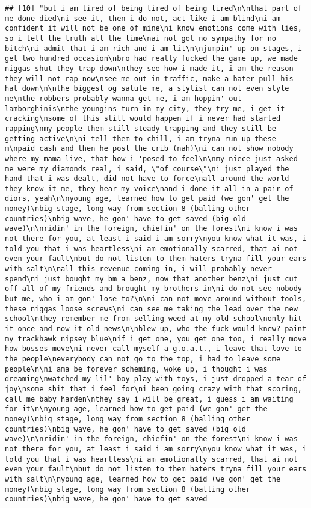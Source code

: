 \documentclass[]{article}
\begin{document}
\begin{verbatim}
## [10] "but i am tired of being tired of being tired\n\nthat part of me done died\ni see it, then i do not, act like i am blind\ni am confident it will not be one of mine\ni know emotions come with lies, so i tell the truth all the time\nai not got no sympathy for no bitch\ni admit that i am rich and i am lit\n\njumpin' up on stages, i get two hundred occasion\nbro had really fucked the game up, we made niggas shut they trap down\nthey see how i made it, i am the reason they will not rap now\nsee me out in traffic, make a hater pull his hat down\n\nthe biggest og salute me, a stylist can not even style me\nthe robbers probably wanna get me, i am hoppin' out lamborghinis\nthe youngins turn in my city, they try me, i get it cracking\nsome of this still would happen if i never had started rapping\nmy people them still steady trapping and they still be getting active\n\ni tell them to chill, i am tryna run up these m\npaid cash and then he post the crib (nah)\ni can not show nobody where my mama live, that how i 'posed to feel\n\nmy niece just asked me were my diamonds real, i said, \"of course\"\ni just played the hand that i was dealt, did not have to force\nall around the world they know it me, they hear my voice\nand i done it all in a pair of diors, yeah\n\nyoung age, learned how to get paid (we gon' get the money)\nbig stage, long way from section 8 (balling other countries)\nbig wave, he gon' have to get saved (big old wave)\n\nridin' in the foreign, chiefin' on the forest\ni know i was not there for you, at least i said i am sorry\nyou know what it was, i told you that i was heartless\ni am emotionally scarred, that ai not even your fault\nbut do not listen to them haters tryna fill your ears with salt\n\nall this revenue coming in, i will probably never spend\ni just bought my bm a benz, now that another benz\ni just cut off all of my friends and brought my brothers in\ni do not see nobody but me, who i am gon' lose to?\n\ni can not move around without tools, these niggas loose screws\ni can see me taking the lead over the new school\nthey remember me from selling weed at my old school\nonly hit it once and now it old news\n\nblew up, who the fuck would knew? paint my trackhawk nipsey blue\nif i get one, you get one too, i really move how bosses move\ni never call myself a g.o.a.t., i leave that love to the people\neverybody can not go to the top, i had to leave some people\n\ni ama be forever scheming, woke up, i thought i was dreaming\nwatched my lil' boy play with toys, i just dropped a tear of joy\nsome shit that i feel for\ni been going crazy with that scoring, call me baby harden\nthey say i will be great, i guess i am waiting for it\n\nyoung age, learned how to get paid (we gon' get the money)\nbig stage, long way from section 8 (balling other countries)\nbig wave, he gon' have to get saved (big old wave)\n\nridin' in the foreign, chiefin' on the forest\ni know i was not there for you, at least i said i am sorry\nyou know what it was, i told you that i was heartless\ni am emotionally scarred, that ai not even your fault\nbut do not listen to them haters tryna fill your ears with salt\n\nyoung age, learned how to get paid (we gon' get the money)\nbig stage, long way from section 8 (balling other countries)\nbig wave, he gon' have to get saved 
\end{verbatim}
\end{document}
